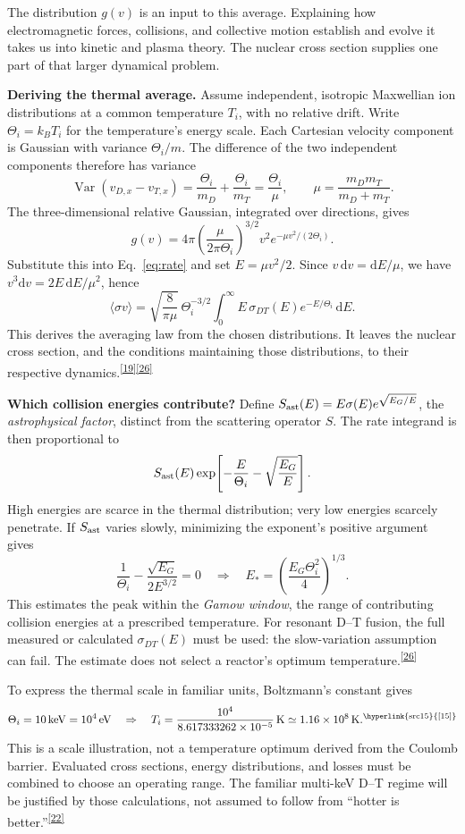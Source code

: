 \documentclass[11pt]{article}
\newcommand{\refn}[1]{\textsuperscript{\hyperlink{src#1}{[#1]}}}
\newcommand{\dd}{\mathrm d}
\begin{document}
The distribution $g(v)$ is an input to this average. Explaining how electromagnetic forces, collisions, and collective motion establish and evolve it takes us into kinetic and plasma theory. The nuclear cross section supplies one part of that larger dynamical problem.

\textbf{Deriving the thermal average.}
Assume independent, isotropic Maxwellian ion distributions at a common temperature $T_i$, with no relative drift. Write $\Theta_i=k_BT_i$ for the temperature's energy scale. Each Cartesian velocity component is Gaussian with variance $\Theta_i/m$. The difference of the two independent components therefore has variance
\[
 \operatorname{Var}(v_{D,x}-v_{T,x})
 =\frac{\Theta_i}{m_D}+\frac{\Theta_i}{m_T}
 =\frac{\Theta_i}{\mu},\qquad \mu=\frac{m_Dm_T}{m_D+m_T}.
\]
The three-dimensional relative Gaussian, integrated over directions, gives
\[
 g(v)=4\pi\left(\frac{\mu}{2\pi\Theta_i}\right)^{3/2}
 v^2e^{-\mu v^2/(2\Theta_i)}.
\]
Substitute this into Eq.~\eqref{eq:rate} and set $E=\mu v^2/2$. Since $v\,\dd v=\dd E/\mu$, we have $v^3\dd v=2E\,\dd E/\mu^2$, hence
\[
 \langle\sigma v\rangle
 =\sqrt{\frac{8}{\pi\mu}}\,\Theta_i^{-3/2}
 \int_0^\infty E\,\sigma_{DT}(E)e^{-E/\Theta_i}\,\dd E.
\]
This derives the averaging law from the chosen distributions. It leaves the nuclear cross section, and the conditions maintaining those distributions, to their respective dynamics.\refn{19}\refn{26}

\textbf{Which collision energies contribute?}
Define $S_{\rm ast}(E)=E\sigma(E)e^{\sqrt{E_G/E}}$, the \emph{astrophysical factor}, distinct from the scattering operator $S$. The rate integrand is then proportional to
\[
 S_{\rm ast}(E)\exp\!\left[-\frac{E}{\Theta_i}-\sqrt{\frac{E_G}{E}}\right].
\]
High energies are scarce in the thermal distribution; very low energies scarcely penetrate. If $S_{\rm ast}$ varies slowly, minimizing the exponent's positive argument gives
\[
 \frac1{\Theta_i}-\frac{\sqrt{E_G}}{2E^{3/2}}=0
 \quad\Longrightarrow\quad E_*=
 \left(\frac{E_G\Theta_i^2}{4}\right)^{1/3}.
\]
This estimates the peak within the \emph{Gamow window}, the range of contributing collision energies at a prescribed temperature. For resonant D--T fusion, the full measured or calculated $\sigma_{DT}(E)$ must be used: the slow-variation assumption can fail. The estimate does not select a reactor's optimum temperature.\refn{26}

To express the thermal scale in familiar units, Boltzmann's constant gives
\[
\Theta_i=10\,\mathrm{keV}=10^4\,\mathrm{eV}
\quad\Rightarrow\quad
T_i=\frac{10^4}{8.617333262\times10^{-5}}\,\mathrm K
\simeq1.16\times10^8\,\mathrm K.\refn{15}
\]
This is a scale illustration, not a temperature optimum derived from the
Coulomb barrier. Evaluated cross sections, energy distributions, and losses
must be combined to choose an operating range. The familiar multi-keV D--T
regime will be justified by those calculations, not assumed to follow from
``hotter is better.''\refn{22}
\end{document}
